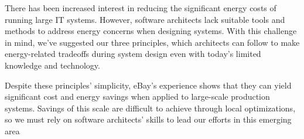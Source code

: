 There has been increased interest in reducing the significant energy costs of running large IT systems. However, software architects lack suitable tools and methods to address energy concerns when designing systems. With this challenge in mind, we've suggested our three principles, which architects can follow to make energy-related tradeoffs during system design even with today's limited knowledge and technology.

Despite these principles' simplicity, eBay's experience shows that they can yield significant cost and energy savings when applied to large-scale production systems. Savings of this scale are difficult to achieve through local optimizations, so we must rely on software architects' skills to lead our efforts in this emerging area




